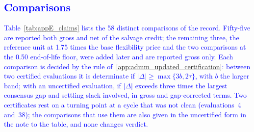 \subsection{\textcolor{blue}{Comparisons}}
\label{app:results_claims}

\textcolor{blue}{
    Table~\ref{tab:appE_claims} lists the 58 distinct comparisons of the record. Fifty-five are reported both gross and net of the salvage credit; the remaining three, the reference unit at 1.75 times the base flexibility price and the two comparisons at the 0.50 end-of-life floor, were added later and are reported gross only. Each comparison is decided by the rule of~\ref{app:admm_updated_certification}: between two certified evaluations it is determinate if $|\Delta| \geq \max\{3b, 2\tau\}$, with $b$ the larger band; with an uncertified evaluation, if $|\Delta|$ exceeds three times the largest consensus gap and settling slack involved, in gross and gap-corrected terms. Two certificates rest on a turning point at a cycle that was not clean (evaluations~4 and~38); the comparisons that use them are also given in the uncertified form in the note to the table, and none changes verdict.
}


